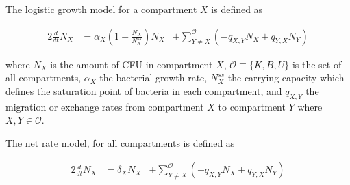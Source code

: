 \documentclass{article}
\begin{document}
The logistic growth model for a compartment $X$ is defined as


\begin{alignat}{2}
\frac{d}{dt} N_{X} &=  \alpha_X \left( 1 - \frac{ N_{X} }{ N_{X}^{ss} }\right)N_{X}  & + \sum_{Y \neq X}^{\mathcal{O} } \left( -q_{X,Y} N_{X} + q_{Y, X} N_{Y} \right)
\label{eq:ODElogistic}
\end{alignat}



where $N_{X}$ is the amount of CFU in compartment $X$, $\mathcal{O} \equiv \{K,B,U\}$ is the set of all compartments, $\alpha_{X}$ the bacterial growth rate, $N^{ss}_{X}$ the carrying capacity which defines the saturation point of bacteria in each compartment, and $q_{X,Y}$ the migration or exchange rates from compartment $X$ to compartment $Y$ where $X,Y \in \mathcal{O}$.

The net rate model,  for all compartments is defined as



\begin{alignat}{2}
\frac{d}{dt} N_{X} &=  \delta_X N_{X} & + \sum_{Y \neq X}^{\mathcal{O} } \left( -q_{X,Y} N_{X} + q_{Y, X} N_{Y} \right)
\label{eq:ODEeffect}
\end{alignat}



\end{document}
